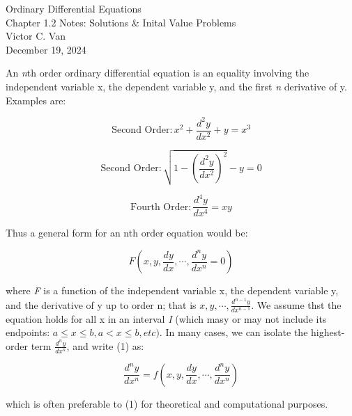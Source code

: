 \documentclass[11pt]{article}
\begin{document}
\begin{titlepage}
    \centering
    \vspace*{\fill} %
    {\Large Ordinary Differential Equations} \\[0.5cm]
    {\Large Chapter 1.2 Notes: Solutions \& Inital Value Problems} \\[0.5cm]
    {\large Victor C. Van} \\[1cm]
    {\large December 19, 2024}
    \vspace*{\fill} %
\end{titlepage}

An \textit{n}th order ordinary differential equation is an equality involving the independent variable x,  the dependent variable y, and the first \textit{n} derivative of y.
Examples are:

\[
    \text{Second Order}: x^{2} + \frac{d^{2}y}{dx^{2}} + y = x^{3}
\]

\[
    \text{Second Order}: \sqrt{1- (\frac{d^{2}y}{dx^{2}})^{2}} - y = 0
\]

\[
    \text{Fourth Order}: \frac{d^{4}y}{dx^{4}} = xy
\]

Thus a general form for an nth order equation would be:

\[
    F(x,y, \frac{dy}{dx}, \cdots, \frac{d^{n}y}{dx^{n}} = 0) \tag{1}
\]

where \textit{F} is a function of the independent variable x, the dependent variable y, and the derivative of y up to order n; that is $x,y, \cdots, \frac{d^{n-1}y}{dx^{n-1}}$.
We assume thst the equation holds for all x in an interval \textit{I} (which masy or may not include its endpoints:
$a \leq x \leq b, a < x \leq b, etc).$ In many cases, we can isolate the highest-order term $\frac{d^{n}y}{dx^{n}}$, and write (1) as:

\[
    \frac{d^{n}y}{dx^{n}} = f(x,y, \frac{dy}{dx}, \cdots, \frac{d^{n}y}{dx^{n}}) \tag{2}
\]

which is often preferable to (1) for theoretical and computational purposes.


\end{document}
